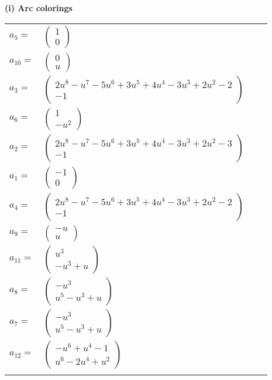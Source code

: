 \documentclass[1p]{elsarticle_modified}
\theoremstyle{definition}
\begin{document}
\flushleft \textbf{(i) Arc colorings}\\
\begin{tabular}{m{7pt} m{180pt} m{7pt} m{180pt} }
\flushright $a_{5}=$&$\begin{pmatrix}1\\0\end{pmatrix}$ \\
\flushright $a_{10}=$&$\begin{pmatrix}0\\u\end{pmatrix}$ \\
\flushright $a_{3}=$&$\begin{pmatrix}2 u^8- u^7-5 u^6+3 u^5+4 u^4-3 u^3+2 u^2-2\\-1\end{pmatrix}$ \\
\flushright $a_{6}=$&$\begin{pmatrix}1\\- u^2\end{pmatrix}$ \\
\flushright $a_{2}=$&$\begin{pmatrix}2 u^8- u^7-5 u^6+3 u^5+4 u^4-3 u^3+2 u^2-3\\-1\end{pmatrix}$ \\
\flushright $a_{1}=$&$\begin{pmatrix}-1\\0\end{pmatrix}$ \\
\flushright $a_{4}=$&$\begin{pmatrix}2 u^8- u^7-5 u^6+3 u^5+4 u^4-3 u^3+2 u^2-2\\-1\end{pmatrix}$ \\
\flushright $a_{9}=$&$\begin{pmatrix}- u\\u\end{pmatrix}$ \\
\flushright $a_{11}=$&$\begin{pmatrix}u^3\\- u^3+u\end{pmatrix}$ \\
\flushright $a_{8}=$&$\begin{pmatrix}- u^3\\u^5- u^3+u\end{pmatrix}$ \\
\flushright $a_{7}=$&$\begin{pmatrix}- u^3\\u^5- u^3+u\end{pmatrix}$ \\
\flushright $a_{12}=$&$\begin{pmatrix}- u^6+u^4-1\\u^6-2 u^4+u^2\end{pmatrix}$\\&\end{tabular}
\end{document}
